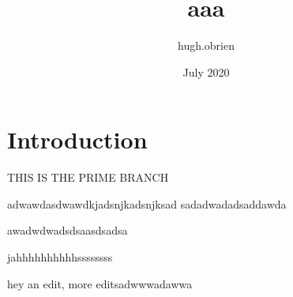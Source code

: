 \documentclass{article}
\title{aaa}
\author{hugh.obrien }
\date{July 2020}
\begin{document}
\maketitle

\section{Introduction}

THIS IS THE PRIME BRANCH

adwawdasdwawdkjadsnjkadsnjksad
sadadwadadsaddawda

awadwdwadsdsaasdsadsa

jahhhhhhhhhhssssssss



hey an edit, more editsadwwwadawwa
\end{document}

